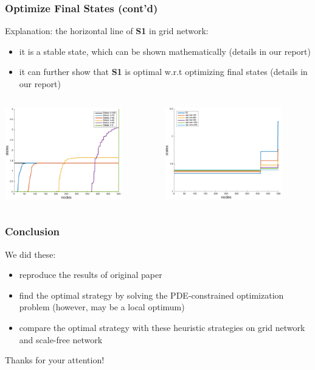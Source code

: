 \documentclass{beamer}
\begin{document}
\begin{frame}
	\frametitle{Optimize Final States (cont'd)}
	
	Explanation: the horizontal line of \textbf{S1} in grid network:
	\begin{itemize}
		\item it is a stable state, which can be shown mathematically (details in our report)
		\item it can further show that \textbf{S1} is optimal w.r.t optimizing final states (details in our report)
	\end{itemize}

	\begin{columns}
		\begin{column}{0.5\textwidth}
			\centering
			\includegraphics[height=40mm]{./figs/Grid_S1_States_small.pdf}
		\end{column}

		\begin{column}{0.5\textwidth}
			\centering
			\includegraphics[height=40mm]{./figs/Grid_OptimalStates_small.pdf}
		\end{column}
	\end{columns}
	
\end{frame}

\begin{frame}
	\frametitle{Conclusion}
	We did these:
	\begin{itemize}
		\item reproduce the results of original paper\footnotemark[1]
		\item find the optimal strategy by solving the PDE-constrained optimization problem (however, may be a local optimum)
		\item compare the optimal strategy with these heuristic strategies on grid network and scale-free network
	\end{itemize}
\end{frame}

\begin{frame}

	\begin{center}
		\Huge Thanks for your attention!
	\end{center}
	
\end{frame}
\end{document}
